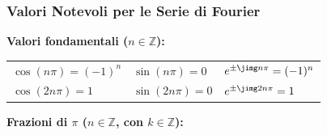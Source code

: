 \subsubsection{Valori Notevoli per le Serie di Fourier}

\noindent\textbf{Valori fondamentali ($n \in \mathbb{Z}$):}
\begin{center}
\begin{tabular}{lll}
    $\cos(n\pi) = (-1)^n$ & $\sin(n\pi) = 0$ & $e^{\pm\jimg n\pi} = (-1)^n$ \\
    $\cos(2n\pi) = 1$     & $\sin(2n\pi) = 0$    & $e^{\pm\jimg 2n\pi} = 1$
\end{tabular}
\end{center}

\noindent\textbf{Frazioni di $\pi$ ($n \in \mathbb{Z}$, con $k \in \mathbb{Z}$):}
